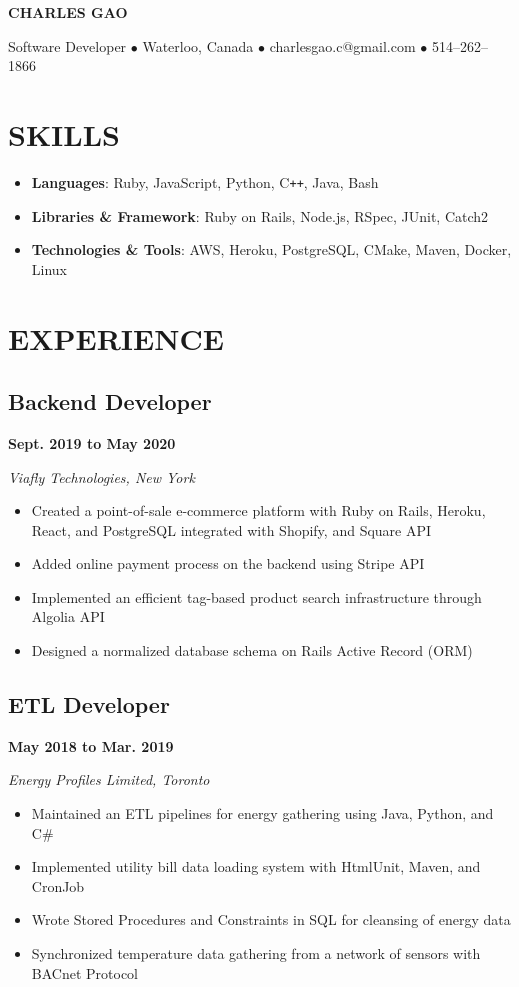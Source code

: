 \documentclass[12pt]{extarticle}
\begin{document}
\begin{center}
\textbf{\huge{CHARLES GAO}}

Software Developer
$\bullet$ Waterloo, Canada
$\bullet$ charlesgao.c@gmail.com
$\bullet$ 514--262--1866
\end{center}

\section*{SKILLS}
\begin{itemize}
  \item \textbf{Languages}: Ruby, JavaScript, Python, C\texttt{++}, Java, Bash
  \item \textbf{Libraries \& Framework}: Ruby on Rails, Node.js, RSpec, JUnit, Catch2
  \item \textbf{Technologies \& Tools}: AWS, Heroku, PostgreSQL, CMake, Maven, Docker, Linux
\end{itemize}

\section*{EXPERIENCE}
\subsection*{Backend Developer} \hfill \textbf{Sept. 2019 to May 2020}

\textit{Viafly Technologies, New York}
\begin{itemize}
  \item Created a point-of-sale e-commerce platform with Ruby on Rails, Heroku, React, and PostgreSQL integrated with Shopify, and Square API
  \item Added online payment process on the backend using Stripe API
  \item Implemented an efficient tag-based product search infrastructure through Algolia API
  \item Designed a normalized database schema on Rails Active Record (ORM)
\end{itemize}

\subsection*{ETL Developer} \hfill \textbf{May 2018 to Mar. 2019}

\textsl{Energy Profiles Limited, Toronto}
\begin{itemize}
  \item Maintained an ETL pipelines for energy gathering using Java, Python, and C\#
  \item Implemented utility bill data loading system with HtmlUnit, Maven, and CronJob
  \item Wrote Stored Procedures and Constraints in SQL for cleansing of energy data
  \item Synchronized temperature data gathering from a network of sensors with BACnet Protocol
\end{itemize}
\end{document}
